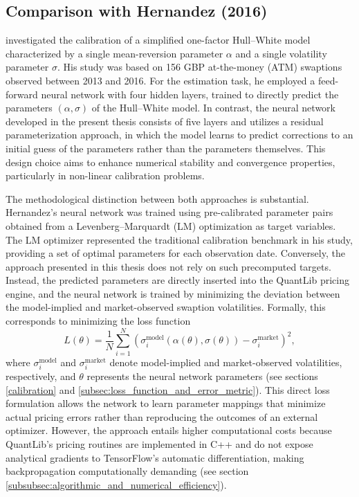 \subsection{Comparison with Hernandez (2016)}
\textcite{hernandez2016model} investigated the calibration of a simplified one-factor Hull–White model characterized by a single mean-reversion parameter $\alpha$ and a single volatility parameter $\sigma$. His study was based on 156 GBP at-the-money (ATM) swaptions observed between 2013 and 2016. For the estimation task, he employed a feed-forward neural network with four hidden layers, trained to directly predict the parameters $(\alpha, \sigma)$ of the Hull--White model. In contrast, the neural network developed in the present thesis consists of five layers and utilizes a residual parameterization approach, in which the model learns to predict corrections to an initial guess of the parameters rather than the parameters themselves. This design choice aims to enhance numerical stability and convergence properties, particularly in non-linear calibration problems.

The methodological distinction between both approaches is substantial. Hernandez’s neural network was trained using pre-calibrated parameter pairs obtained from a Levenberg–Marquardt (LM) optimization as target variables. The LM optimizer represented the traditional calibration benchmark in his study, providing a set of optimal parameters for each observation date. Conversely, the approach presented in this thesis does not rely on such precomputed targets. Instead, the predicted parameters are directly inserted into the QuantLib pricing engine, and the neural network is trained by minimizing the deviation between the model-implied and market-observed swaption volatilities. Formally, this corresponds to minimizing the loss function
\[
L(\theta) = \frac{1}{N} \sum_{i=1}^{N} \left( \sigma^{\text{model}}_i(\alpha(\theta), \sigma(\theta)) - \sigma^{\text{market}}_i \right)^2,
\]
where $\sigma^{\text{model}}_i$ and $\sigma^{\text{market}}_i$ denote model-implied and market-observed volatilities, respectively, and $\theta$ represents the neural network parameters (see sections \ref{calibration} and \ref{subsec:loss_function_and_error_metric}). This direct loss formulation allows the network to learn parameter mappings that minimize actual pricing errors rather than reproducing the outcomes of an external optimizer. However, the approach entails higher computational costs because QuantLib’s pricing routines are implemented in C++ and do not expose analytical gradients to TensorFlow’s automatic differentiation, making backpropagation computationally demanding (see section \ref{subsubsec:algorithmic_and_numerical_efficiency}).


